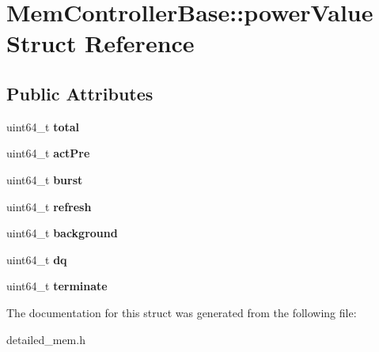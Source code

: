 \hypertarget{structMemControllerBase_1_1powerValue}{\section{Mem\-Controller\-Base\-:\-:power\-Value Struct Reference}
\label{structMemControllerBase_1_1powerValue}
}
\subsection*{Public Attributes}
\begin{DoxyCompactItemize}
\item 
\hypertarget{structMemControllerBase_1_1powerValue_a0060a736b0ccc8ed8ce2f79852df581f}{uint64\-\_\-t {\bfseries total}}\label{structMemControllerBase_1_1powerValue_a0060a736b0ccc8ed8ce2f79852df581f}

\item 
\hypertarget{structMemControllerBase_1_1powerValue_aea83fe4e96bbd96403a4fca259a66e38}{uint64\-\_\-t {\bfseries act\-Pre}}\label{structMemControllerBase_1_1powerValue_aea83fe4e96bbd96403a4fca259a66e38}

\item 
\hypertarget{structMemControllerBase_1_1powerValue_a57ce4e225c0ed111e3b0eb993954acee}{uint64\-\_\-t {\bfseries burst}}\label{structMemControllerBase_1_1powerValue_a57ce4e225c0ed111e3b0eb993954acee}

\item 
\hypertarget{structMemControllerBase_1_1powerValue_aa0563aa3d1b86de87f0425fdb2fab301}{uint64\-\_\-t {\bfseries refresh}}\label{structMemControllerBase_1_1powerValue_aa0563aa3d1b86de87f0425fdb2fab301}

\item 
\hypertarget{structMemControllerBase_1_1powerValue_a066991b7e8d20754418d04003f94dc74}{uint64\-\_\-t {\bfseries background}}\label{structMemControllerBase_1_1powerValue_a066991b7e8d20754418d04003f94dc74}

\item 
\hypertarget{structMemControllerBase_1_1powerValue_aa0e261b1c314d19804a466e086cf3798}{uint64\-\_\-t {\bfseries dq}}\label{structMemControllerBase_1_1powerValue_aa0e261b1c314d19804a466e086cf3798}

\item 
\hypertarget{structMemControllerBase_1_1powerValue_aa9b0fc6c03060a3a03d2d9defd6da36b}{uint64\-\_\-t {\bfseries terminate}}\label{structMemControllerBase_1_1powerValue_aa9b0fc6c03060a3a03d2d9defd6da36b}

\end{DoxyCompactItemize}


The documentation for this struct was generated from the following file\-:\begin{DoxyCompactItemize}
\item 
detailed\-\_\-mem.\-h\end{DoxyCompactItemize}
